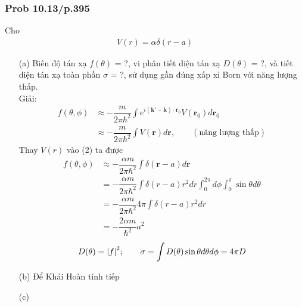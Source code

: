 \documentclass{report}
\newcommand{\f}[2]{\dfrac{#1}{#2}}
\begin{document}
\subsubsection{Prob 10.13/p.395}
Cho 
\begin{align*}
	V(r) = \alpha \delta(r-a)
\end{align*}
\begin{enumerate}
	\item [(a)] Biên độ tán xạ $f(\theta)$ = ?, vi phân tiết diện tán xạ $D(\theta)$ = ?, và tiết diện tán xạ toàn phần $\sigma$ = ?, sử dụng gần đúng xấp xỉ Born với năng lượng thấp.\\
Giải:
\begin{align*}
	f(\theta,\phi) 
	&\approx -\f{m}{2\pi \hbar^2} \int e^{i(\mathbf{k' - k})\cdot \mathbf{r}_0} V(\mathbf{r}_0) d\mathbf{r}_0 \tag{1}\\
	&\approx -\f{m}{2\pi \hbar^2} \int V(\mathbf{r}) d\mathbf{r}, \quad \quad (\text{năng lượng thấp}) \tag{2}
\end{align*}
Thay $V(r)$ vào (2) ta được
\begin{align*}
	f(\theta,\phi) 
	&\approx  -\f{\alpha m}{2\pi \hbar^2} \int \delta(\mathbf{r} - a) d\mathbf{r} \\
	&=  -\f{\alpha m}{2\pi \hbar^2} \int \delta(r - a)r^2 dr \int_{0}^{2\pi}d\phi \int_{0}^{\pi}\sin\theta d\theta \\
	&=  -\f{\alpha m}{2\pi \hbar^2} 4\pi \int \delta(r - a)r^2 dr  \\
	& = -\f{2\alpha m}{ \hbar^2} a^2
\end{align*}
\begin{align*}
	D(\theta) = \abs{f}^2 ; \quad \quad \sigma = \int D(\theta)\sin\theta d\theta d\phi = 4\pi D
\end{align*}
	\item [(b)] Để Khải Hoàn tính tiếp
	\item [(c)] 
\end{enumerate}
\end{document}
